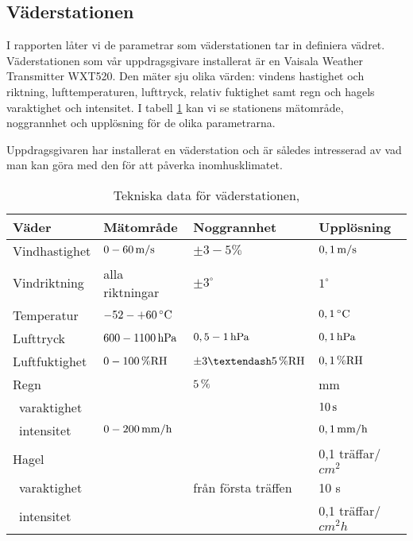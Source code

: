\subsection{Väderstationen}
\label{subsec_weatertransmitter}
I rapporten låter vi de parametrar som väderstationen tar in definiera vädret. Väderstationen som vår uppdragsgivare installerat är en Vaisala Weather Transmitter WXT520. Den mäter sju olika värden: vindens hastighet och riktning, lufttemperaturen, lufttryck, relativ fuktighet samt regn och hagels varaktighet och intensitet. I tabell \ref{tbl:weathertransmitter} kan vi se stationens mätområde, noggrannhet och upplösning för de olika parametrarna.

Uppdragsgivaren har installerat en väderstation och är således intresserad av vad man kan göra med den för att påverka inomhusklimatet.

\begin{table}[htdp]
\caption{Tekniska data för väderstationen, \cite{datasheet_weathertransmitter}}
\begin{center}
\begin{tabular}{|l | l l l|}
\hline
\textbf{Väder} & \textbf{Mätområde} %
 & \textbf{Noggrannhet} %
 & \textbf{Upplösning} \\ %
\hline
\rule{0pt}{3ex}Vindhastighet & $\unit[0-60]{m/s}$ & $\pm 3-5\%$ & $\unit[0,1]{m/s}$ \\ 
\rule{0pt}{3ex}Vindriktning & alla riktningar & $\pm 3^{\circ}$ & $1^{\circ}$ \\
\rule{0pt}{3ex}Temperatur & $\unit[-52-+60]{^{\circ}C}$ & & $\unit[0,1]{^{\circ}C}$ \\
\rule{0pt}{3ex}Lufttryck & $\unit[600-1100]{hPa}$ & $\unit[0,5-1]{hPa}$ & $\unit[0,1]{hPa}$ \\
\rule{0pt}{3ex}Luftfuktighet & $\unit[0-100]{\%RH}$ & $\unit[\pm3–5]{\%RH}$ & $\unit[0,1]{\%RH}$ \\
\rule{0pt}{3ex}Regn &  & $\unit[5]{\%}$ & \unit[0,01]{mm} \\
~varaktighet & & & $\unit[10]{s}$\\
~intensitet & $\unit[0-200]{mm/h}$ & & $\unit[0,1]{mm/h}$ \\
\rule{0pt}{3ex}Hagel &  &  & 0,1 träffar/$\unit{cm^2}$ \\
~varaktighet & & från första träffen & 10 s\\
~intensitet & & & 0,1 träffar/$\unit{cm^2h}$\\
\hline
\end{tabular}
\end{center}
\label{tbl:weathertransmitter}
\end{table}
